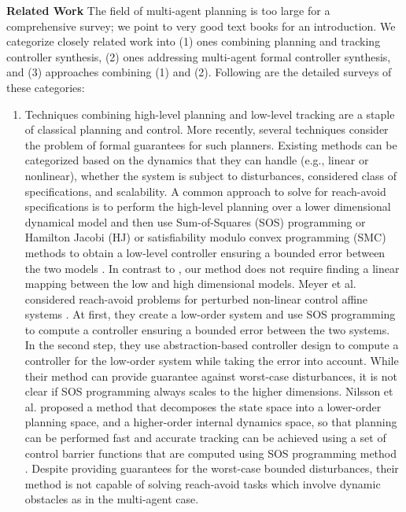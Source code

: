 \smallskip
\noindent\textbf{Related Work}
%
The field of multi-agent planning is too large for a comprehensive survey; we point to very good text books
\cite{LaValle2006,LaValle1998planning,choset2005principles,russel2010AIplanning} for an introduction.
We categorize closely related work into (1) ones combining planning and tracking controller synthesis, 
(2) ones addressing multi-agent formal controller synthesis, and 
(3) approaches combining (1) and (2).
Following are the detailed surveys of these categories:

\begin{enumerate}[(1)]
	\item Techniques combining high-level planning and low-level tracking are a staple of classical planning and control. 
More recently, several techniques consider the problem of formal guarantees for such planners.
Existing methods can be categorized based on the dynamics that they can handle (e.g., linear or nonlinear),
whether the system is subject to disturbances, considered class of specifications, and scalability. 
A common approach to solve for reach-avoid specifications is to perform the high-level planning over a lower dimensional dynamical model and then use
Sum-of-Squares (SOS) programming or Hamilton Jacobi (HJ) or satisfiability modulo convex programming (SMC) methods to obtain a low-level controller ensuring a bounded error between the 
two models \cite{herbert2017fastrack,meyer2019,singh2018robust,Nilsson:2018}. 
In contrast to \cite{herbert2017fastrack,singh2018robust}, our method does not require finding 
a linear mapping between the low and high dimensional models. Meyer et al. considered reach-avoid problems for perturbed non-linear control affine systems \cite{meyer2019}. At first, they create a low-order system and use SOS programming to compute a controller ensuring a bounded error between the two systems. In the second step, they use abstraction-based controller design to compute a controller for the low-order system while taking the error into account. While their method can provide guarantee against worst-case disturbances, it is not clear if SOS programming always scales to the higher dimensions. 
Nilsson et al.  proposed a method that decomposes the state space into a lower-order planning space, and a higher-order internal dynamics space, so that planning can be performed fast and accurate tracking can be achieved using a set of control barrier functions that are computed using SOS programming method \cite{Nilsson:2018}. Despite providing guarantees for the worst-case bounded disturbances, their method is not capable of solving reach-avoid tasks which involve dynamic obstacles as in the multi-agent case.

\end{enumerate}
